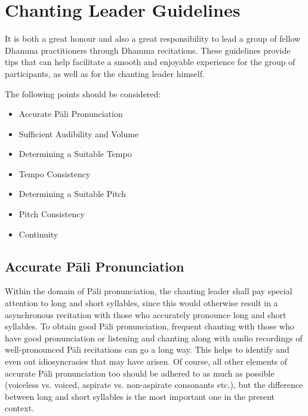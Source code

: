 \section{Chanting Leader Guidelines}

\begin{justify}
  It is both a great honour and also a great responsibility to lead a group of fellow Dhamma practitioners through Dhamma recitations. These guidelines provide tips that can help facilitate a smooth and enjoyable experience for the group of participants, as well as for the chanting leader himself.
\end{justify}

The following points should be considered:

\begin{itemize}
  \item Accurate Pāli Pronunciation
  \item Sufficient Audibility and Volume
  \item Determining a Suitable Tempo
  \item Tempo Consistency
  \item Determining a Suitable Pitch
  \item Pitch Consistency
  \item Continuity
\end{itemize}

\subsection*{Accurate Pāli Pronunciation}
\begin{justify}
  Within the domain of Pāli pronunciation, the chanting leader shall pay special attention to long and short syllables, since this would otherwise result in a asynchronous recitation with those who accurately pronounce long and short syllables. To obtain good Pāli pronunciation, frequent chanting with those who have good pronunciation or listening and chanting along with audio recordings of well-pronounced Pāli recitations can go a long way. This helps to identify and even out idiosyncrasies that may have arisen. Of course, all other elements of accurate Pāli pronunciation too should be adhered to as much as possible (voiceless vs. voiced, aspirate vs. non-aspirate consonants etc.), but the difference between long and short syllables is the most important one in the present context.
\end{justify}

